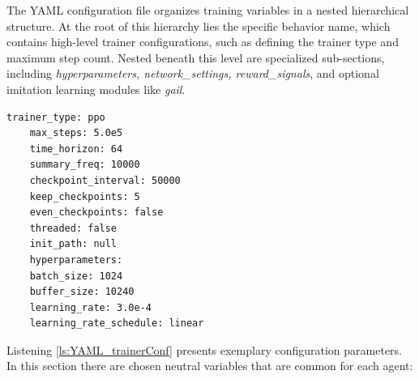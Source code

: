 The YAML configuration file organizes training variables in a nested hierarchical structure. At the root of this hierarchy lies the specific behavior name, which contains high-level trainer configurations, such as defining the trainer type and maximum step count. Nested beneath this level are specialized sub-sections, including \textit{hyperparameters, network\_settings, reward\_signals}, and optional imitation learning modules like \textit{gail}.
\cite{unitymlagentsTrainingConf}

\begin{lstlisting}[caption={Trainer Configuration Parameters.}, label={ls:YAML_trainerConf}]
	trainer_type: ppo
	max_steps: 5.0e5
	time_horizon: 64
	summary_freq: 10000
	checkpoint_interval: 50000
	keep_checkpoints: 5
	even_checkpoints: false
	threaded: false
	init_path: null
	hyperparameters:
	batch_size: 1024
	buffer_size: 10240
	learning_rate: 3.0e-4
	learning_rate_schedule: linear
\end{lstlisting}
Listening \ref{ls:YAML_trainerConf} presents exemplary configuration parameters. In this section there are chosen neutral variables that are common for each agent:
